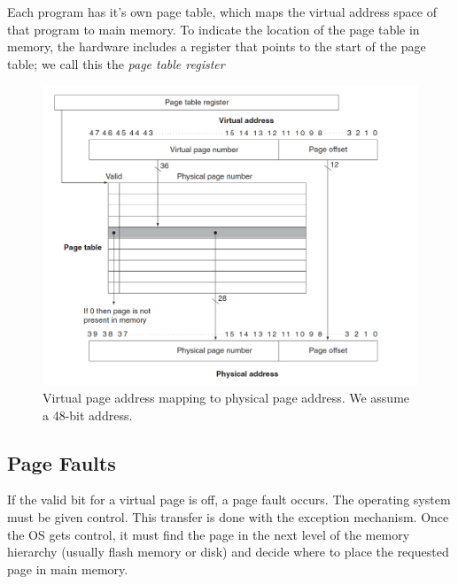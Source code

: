 \documentclass[12pt]{article}
\begin{document}
Each program has it's own page table, which maps the virtual address space of that program to main memory. To indicate the location of the page table in memory, the hardware includes a register that points to the start of the page table; we call this the \emph{page table register}
\begin{figure}[H]
    \centering
    \includegraphics[scale=0.38]{images/page-table.png}
    \caption{Virtual page address mapping to physical page address. We assume a 48-bit address.}
\end{figure}

\subsection*{Page Faults}
If the valid bit for a virtual page is off, a page fault occurs. The operating system must be given control. This transfer is done with the exception mechanism. Once the OS gets control, it must find the page in the next level of the memory hierarchy (usually flash memory or disk) and decide where to place the requested page in main memory.
\end{document}
